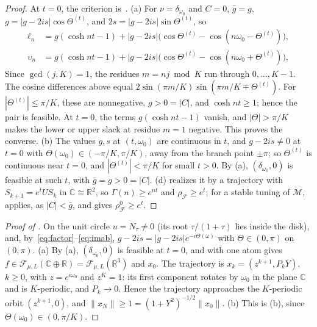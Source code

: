 \documentclass[11pt]{article}
\theoremstyle{definition}
\theoremstyle{remark}
\newcommand{\R}{\mathbb R}
\newcommand{\C}{\mathbb C}
\newcommand{\cF}{\mathcal F}
\newcommand{\cM}{\mathcal M}
\newcommand{\ch}{\cosh}
\newcommand{\norm}[1]{\lVert #1\rVert}
\newcommand{\rhoF}{\rho_{\cF}}
\newcommand{\rhoz}{\rho_{\cF}^{0}}
\begin{document}
\begin{proof}
At \(t=0\), the criterion is~\cite[Proposition~D.9]{TA}.
(a) For \(\nu=\delta_{\omega_0}\) and \(C=0\), \(\bar g=g\),
\(g=|g-2is|\cos\Theta^{(t)}\), and \(2s=|g-2is|\sin\Theta^{(t)}\), so
\[
\begin{aligned}
\ell_n&=g(\ch nt-1)+|g-2is|\bigl(\cos\Theta^{(t)}-\cos(n\omega_0-\Theta^{(t)})\bigr),\\
\upsilon_n&=g(\ch nt-1)+|g-2is|\bigl(\cos\Theta^{(t)}-\cos(n\omega_0+\Theta^{(t)})\bigr),
\end{aligned}
\]
Since \(\gcd(j,K)=1\), the residues \(m=nj\bmod K\) run through \(0,\ldots,K-1\).
The cosine differences above equal
\(2\sin(\pi m/K)\sin(\pi m/K\mp\Theta^{(t)})\).
For \(|\Theta^{(t)}|\le\pi/K\), these are nonnegative, \(g>0=|C|\), and \(\ch nt\ge1\);
hence the pair is feasible.  At \(t=0\), the terms \(g(\ch nt-1)\) vanish,
and \(|\Theta|>\pi/K\) makes the lower or upper slack at residue \(m=1\) negative.
This proves the converse.
(b) The values \(g,s\) at \((t,\omega_0)\) are continuous in \(t\), and \(g-2is\ne0\) at \(t=0\) with \(\Theta(\omega_0)\in(-\pi/K,\pi/K)\), away from the
branch point \(\pm\pi\); so \(\Theta^{(t)}\) is continuous near \(t=0\), and \(|\Theta^{(t)}|<\pi/K\) for small \(t>0\).  By (a), \((\delta_{\omega_0},0)\) is
feasible at such \(t\), with \(\bar g=g>0=|C|\).  (d) realizes it by a trajectory with \(S_{k+1}=e^tUS_k\) in \(\C\cong\R^2\), so
\(\Gamma(n)\ge e^{nt}\) and \(\rhoF\ge e^t\); for a stable tuning of \(\cM\),  applies, as \(|C|<\bar g\), and gives \(\rhoz\ge e^t\).
\end{proof}



\begin{proof}[Proof of ]
On the unit circle \(u=N_\tau\ne0\) (its root \(\tau/(1+\tau)\) lies inside the disk), and,
by~\eqref{eq:factor}--\eqref{eq:imab}, \(g-2is=|g-2is|e^{-i\Theta(\omega)}\) with \(\Theta\in(0,\pi)\) on
\((0,\pi)\).
(a) By (a), \((\delta_{\omega_0},0)\) is feasible at \(t=0\), and  with
one atom gives \(f\in\cF_{\mu,L}(\C\oplus\R)=\cF_{\mu,L}(\R^3)\) and \(x_0\).  The trajectory is
\(x_k=(z^{k+1},P_kY)\), \(k\ge0\), with \(z=e^{i\omega_0}\) and \(z^K=1\): its first component rotates by
\(\omega_0\) in the plane \(\C\) and is \(K\)-periodic, and \(P_k\to0\).  Hence the trajectory
approaches the \(K\)-periodic orbit \((z^{k+1},0)\), and
\(\norm{x_N}\ge1=(1+Y^2)^{-1/2}\norm{x_0}\).
(b) This is (b), since \(\Theta(\omega_0)\in(0,\pi/K)\).
\end{proof}
\end{document}
